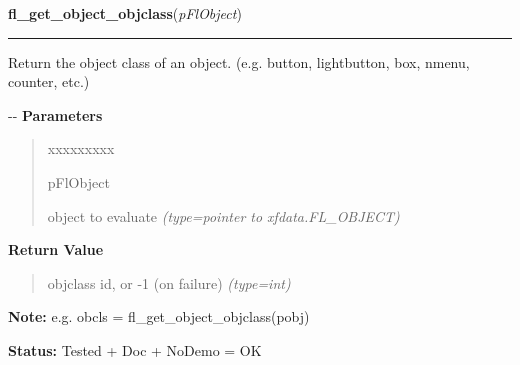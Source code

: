     \label{xformslib:flbasic:fl_get_object_objclass}

    \vspace{0.5ex}

\hspace{.8\funcindent}\begin{boxedminipage}{\funcwidth}

    \raggedright \textbf{fl\_get\_object\_objclass}(\textit{pFlObject})

    \vspace{-1.5ex}

    \rule{\textwidth}{0.5\fboxrule}
\setlength{\parskip}{2ex}

Return the object class of an object. (e.g. button, lightbutton, box,
nmenu, counter, etc.)

-{}-
\setlength{\parskip}{1ex}
      \textbf{Parameters}
      \vspace{-1ex}

      \begin{quote}
        \begin{Ventry}{xxxxxxxxx}

          \item[pFlObject]


object to evaluate
            {\it (type=pointer to xfdata.FL\_OBJECT)}

        \end{Ventry}

      \end{quote}

      \textbf{Return Value}
    \vspace{-1ex}

      \begin{quote}

objclass id, or -1 (on failure)
      {\it (type=int)}

      \end{quote}

\textbf{Note:} 
e.g. obcls = fl\_get\_object\_objclass(pobj)


\textbf{Status:} 
Tested + Doc + NoDemo = OK


    \end{boxedminipage}

    \label{xformslib:flbasic:fl_get_object_type}


